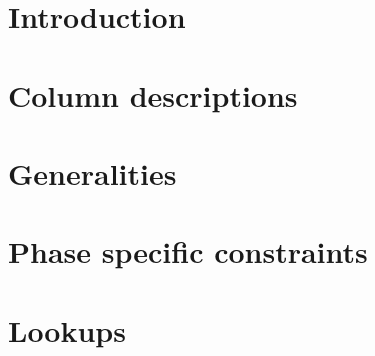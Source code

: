 

\section{Introduction}                   \label{rlptxn: intro}                           
\section{Column descriptions}            \label{rlptxn: column descriptions}             
\section{Generalities}                   \label{rlptxn: generalities}                    
\section{Phase specific constraints}     \label{rlptxn: phase specific constraints}      
\section{Lookups}                        \label{rlptxn: lookups}                         
